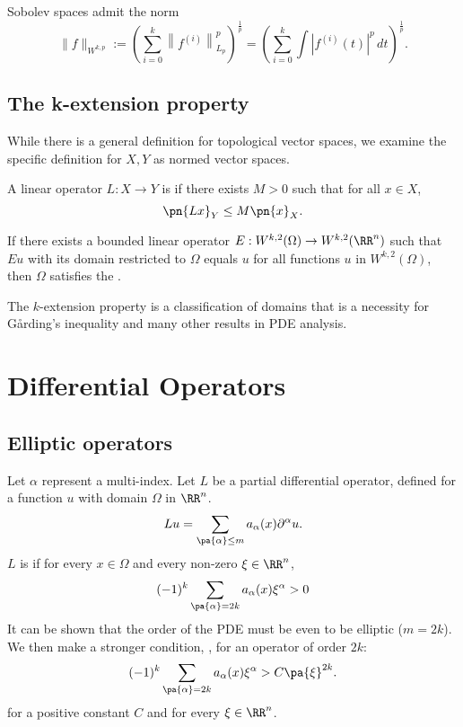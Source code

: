\documentclass{scrartcl}
\begin{document}
Sobolev spaces admit the norm 
\[
    \|f\|_{W^{k,p}} := \left (\sum_{i=0}^k \left \|f^{(i)} \right \|_{L_p}^p \right)^{\frac{1}{p}} = \left (\sum_{i=0}^k \int \left |f^{(i)}(t) \right |^p\,dt \right )^{\frac{1}{p}}.
\]

\subsection{The k-extension property}
While there is a general definition for topological vector spaces,
we examine the specific definition for $X,Y$ as normed vector spaces.

\begin{definition}
    A linear operator $L:X\to Y$ is  if 
    there exists $M>0$ such that for all $x\in X$,
    \[
        \pn{Lx}_{Y} \leq M\pn{x}_X.
    \]
\end{definition}

\begin{definition}
    If there exists a bounded linear operator 
    $E:W^{k,2}(\Omega) \to W^{k,2}(\RR^n)$ 
    such that $Eu$ with its domain restricted to $\Omega$ equals $u$ 
    for all functions $u$ in 
    $W^{k,2}(\Omega)$, then $\Omega$ satisfies the 
    .
\end{definition}

The $k$-extension property is a classification of 
domains that is a necessity for
G\r{a}rding's inequality and many other results in PDE analysis.

\section{Differential Operators}

\subsection{Elliptic operators}

\begin{definition}
    Let $\alpha$ represent a multi-index.
    Let $L$ be a partial differential operator, defined for a function 
    $u$ with domain $\Omega$ in $\RR^n$. 
    \[
    Lu = \sum_{\pa{\alpha}\leq m} a_\alpha(x)\partial^\alpha u.
    \]
    $L$ is  if for every $x\in \Omega$ and every non-zero 
    $\xi \in \RR^n$, 
    \[
        (-1)^k\sum_{\pa{\alpha}=2k} a_\alpha(x)\xi^\alpha > 0
    \]
    It can be shown that the order of the PDE must be even to be elliptic 
    ($m=2k$). We then make a stronger condition, , for an operator of order $2k$:
    \[
        (-1)^k \sum_{\pa{\alpha}=2k} a_\alpha(x)\xi^\alpha > C\pa{\xi}^{2k}.
    \]
    for a positive constant $C$ and for every $\xi\in\RR^n$.
\end{definition}
\end{document}

